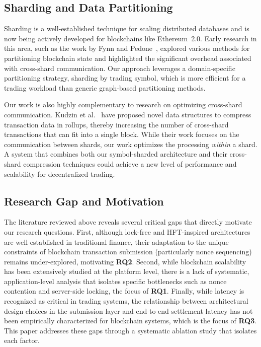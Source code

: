 \subsection{Sharding and Data Partitioning}

Sharding is a well-established technique for scaling distributed databases and is now being actively developed for blockchains like Ethereum~2.0. Early research in this area, such as the work by Fynn and Pedone~\cite{fynn2018partitioning}, explored various methods for partitioning blockchain state and highlighted the significant overhead associated with cross-shard communication. Our approach leverages a domain-specific partitioning strategy, sharding by trading symbol, which is more efficient for a trading workload than generic graph-based partitioning methods.

Our work is also highly complementary to research on optimizing cross-shard communication. Kudzin et al.~\cite{kudzin2022sharding} have proposed novel data structures to compress transaction data in rollups, thereby increasing the number of cross-shard transactions that can fit into a single block. While their work focuses on the communication between shards, our work optimizes the processing \textit{within} a shard. A system that combines both our symbol-sharded architecture and their cross-shard compression techniques could achieve a new level of performance and scalability for decentralized trading.

\subsection{Research Gap and Motivation}

The literature reviewed above reveals several critical gaps that directly motivate our research questions. First, although lock-free and HFT-inspired architectures are well-established in traditional finance, their adaptation to the unique constraints of blockchain transaction submission (particularly nonce sequencing) remains under-explored, motivating \textbf{RQ2}. Second, while blockchain scalability has been extensively studied at the platform level, there is a lack of systematic, application-level analysis that isolates specific bottlenecks such as nonce contention and server-side locking, the focus of \textbf{RQ1}. Finally, while latency is recognized as critical in trading systems, the relationship between architectural design choices in the submission layer and end-to-end settlement latency has not been empirically characterized for blockchain systems, which is the focus of \textbf{RQ3}. This paper addresses these gaps through a systematic ablation study that isolates each factor.

